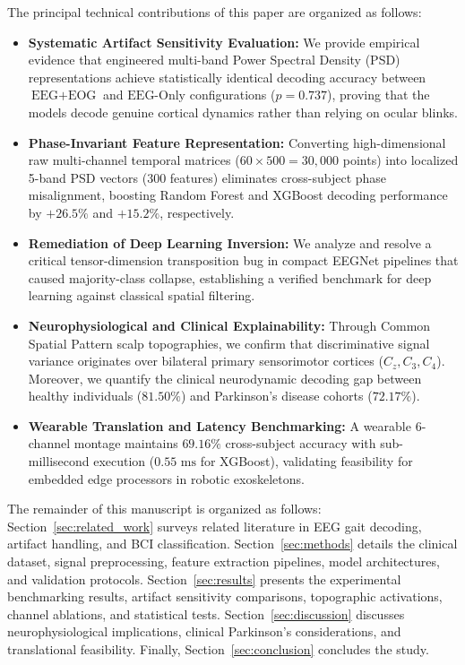 \documentclass[review,12pt]{elsarticle}
\begin{document}
The principal technical contributions of this paper are organized as follows:
\begin{itemize}
    \item \textbf{Systematic Artifact Sensitivity Evaluation:} We provide empirical evidence that engineered multi-band Power Spectral Density (PSD) representations achieve statistically identical decoding accuracy between $\text{EEG}+\text{EOG}$ and $\text{EEG-Only}$ configurations ($p = 0.737$), proving that the models decode genuine cortical dynamics rather than relying on ocular blinks.
    \item \textbf{Phase-Invariant Feature Representation:} Converting high-dimensional raw multi-channel temporal matrices ($60 \times 500 = 30,000$ points) into localized 5-band PSD vectors ($300$ features) eliminates cross-subject phase misalignment, boosting Random Forest and XGBoost decoding performance by $+26.5\%$ and $+15.2\%$, respectively.
    \item \textbf{Remediation of Deep Learning Inversion:} We analyze and resolve a critical tensor-dimension transposition bug in compact EEGNet pipelines that caused majority-class collapse, establishing a verified benchmark for deep learning against classical spatial filtering.
    \item \textbf{Neurophysiological and Clinical Explainability:} Through Common Spatial Pattern scalp topographies, we confirm that discriminative signal variance originates over bilateral primary sensorimotor cortices ($C_z, C_3, C_4$). Moreover, we quantify the clinical neurodynamic decoding gap between healthy individuals ($81.50\%$) and Parkinson's disease cohorts ($72.17\%$).
    \item \textbf{Wearable Translation and Latency Benchmarking:} A wearable 6-channel montage maintains $69.16\%$ cross-subject accuracy with sub-millisecond execution ($0.55\text{ ms}$ for XGBoost), validating feasibility for embedded edge processors in robotic exoskeletons.
\end{itemize}

The remainder of this manuscript is organized as follows: Section~\ref{sec:related_work} surveys related literature in EEG gait decoding, artifact handling, and BCI classification. Section~\ref{sec:methods} details the clinical dataset, signal preprocessing, feature extraction pipelines, model architectures, and validation protocols. Section~\ref{sec:results} presents the experimental benchmarking results, artifact sensitivity comparisons, topographic activations, channel ablations, and statistical tests. Section~\ref{sec:discussion} discusses neurophysiological implications, clinical Parkinson's considerations, and translational feasibility. Finally, Section~\ref{sec:conclusion} concludes the study.
\end{document}

